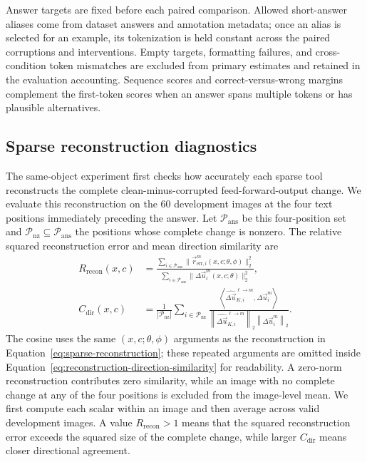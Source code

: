Answer targets are fixed before each paired comparison. Allowed short-answer aliases come from dataset answers and annotation metadata; once an alias is selected for an example, its tokenization is held constant across the paired corruptions and interventions. Empty targets, formatting failures, and cross-condition token mismatches are excluded from primary estimates and retained in the evaluation accounting. Sequence scores and correct-versus-wrong margins complement the first-token scores when an answer spans multiple tokens or has plausible alternatives.

\subsection{Sparse reconstruction diagnostics}

The same-object experiment first checks how accurately each sparse tool reconstructs the complete clean-minus-corrupted feed-forward-output change. We evaluate this reconstruction on the 60 development images at the four text positions immediately preceding the answer. Let $\mathcal{P}_{\mathrm{ans}}$ be this four-position set and $\mathcal{P}_{\mathrm{nz}}\subseteq\mathcal{P}_{\mathrm{ans}}$ the positions whose complete change is nonzero. The relative squared reconstruction error and mean direction similarity are
\begin{align}
R_{\mathrm{recon}}(x,c)
&=\frac{\sum_{i\in\mathcal{P}_{\mathrm{ans}}}\|\vec{r}_{\mathrm{err},i}^{m}(x,c;\theta,\phi)\|_2^2}
        {\sum_{i\in\mathcal{P}_{\mathrm{ans}}}\|\Delta\vec{u}_{i}^{m}(x,c;\theta)\|_2^2},
\label{eq:relative-reconstruction-error}\\
C_{\mathrm{dir}}(x,c)
&=\frac{1}{|\mathcal{P}_{\mathrm{nz}}|}
  \sum_{i\in\mathcal{P}_{\mathrm{nz}}}
  \frac{\left\langle\widehat{\Delta\vec{u}}_{K,i}^{\ell\rightarrow m},
  \Delta\vec{u}_{i}^{m}\right\rangle}
  {\left\|\widehat{\Delta\vec{u}}_{K,i}^{\ell\rightarrow m}\right\|_2
   \left\|\Delta\vec{u}_{i}^{m}\right\|_2}.
\label{eq:reconstruction-direction-similarity}
\end{align}
The cosine uses the same $(x,c;\theta,\phi)$ arguments as the reconstruction in Equation~\ref{eq:sparse-reconstruction}; these repeated arguments are omitted inside Equation~\ref{eq:reconstruction-direction-similarity} for readability. A zero-norm reconstruction contributes zero similarity, while an image with no complete change at any of the four positions is excluded from the image-level mean. We first compute each scalar within an image and then average across valid development images. A value $R_{\mathrm{recon}}>1$ means that the squared reconstruction error exceeds the squared size of the complete change, while larger $C_{\mathrm{dir}}$ means closer directional agreement.

